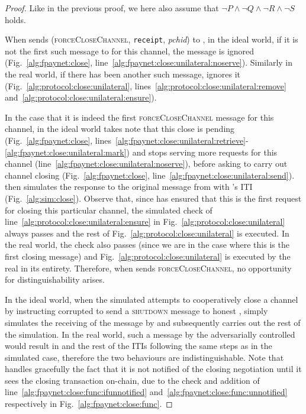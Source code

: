 \begin{proof}
  Like in the previous proof, we here also assume that $\neg P \wedge \neg Q
  \wedge \neg R \wedge \neg S$ holds.

  When \environment{} sends (\textsc{forceCloseChannel}, \texttt{receipt},
  \textit{pchid}) to \alice, in the ideal world, if it is not the first such
  message to \alice{} for this channel, the message is ignored
  (Fig.~\ref{alg:fpaynet:close},
  line~\ref{alg:fpaynet:close:unilateral:noserve}). Similarly in the real world,
  if there has been another such message, \alice{} ignores it
  (Fig.~\ref{alg:protocol:close:unilateral},
  lines~\ref{alg:protocol:close:unilateral:remove}
  and~\ref{alg:protocol:close:unilateral:ensure}).

  In the case that it is indeed the first \textsc{forceCloseChannel} message for
  this channel, in the ideal world \fpaynet{} takes note that this close is
  pending (Fig.~\ref{alg:fpaynet:close},
  lines~\ref{alg:fpaynet:close:unilateral:retrieve}-\ref{alg:fpaynet:close:unilateral:mark})
  and stops serving more requests for this channel
  (line~\ref{alg:fpaynet:close:unilateral:noserve}), before asking \simulator{}
  to carry out channel closing (Fig.~\ref{alg:fpaynet:close},
  line~\ref{alg:fpaynet:close:unilateral:send}). \simulator{} then simulates the
  response to the original message from \environment{} with \alice's ITI
  (Fig.~\ref{alg:sim:close}). Observe that, since \fpaynet{} has ensured that
  this is the first request for closing this particular channel, the simulated
  check of line~\ref{alg:protocol:close:unilateral:ensure} in
  Fig.~\ref{alg:protocol:close:unilateral} always passes and the rest of
  Fig.~\ref{alg:protocol:close:unilateral} is executed. In the real world, the
  check also passes (since we are in the case where this is the first closing
  message) and Fig.~\ref{alg:protocol:close:unilateral} is executed by the real
  \alice{} in its entirety. Therefore, when \environment{} sends
  \textsc{forceCloseChannel}, no opportunity for distinguishability arises.

  In the ideal world, when the simulated \adversary{} attempts to cooperatively
  close a channel by instructing corrupted \alice{} to send a \textsc{shutdown}
  message to honest \bob, \simulator{} simply simulates the receiving of the
  message by \bob{} and subsequently carries out the rest of the simulation. In
  the real world, such a message by the adversarially controlled \alice{} would
  result in \bob{} and the rest of the ITIs following the same steps as in the
  simulated case, therefore the two behaviours are indistinguishable. Note that
  \fpaynet{} handles gracefully the fact that it is not notified of the closing
  negotiation until it sees the closing transaction on-chain, due to the check
  and addition of line~\ref{alg:fpaynet:close:func:ifunnotified}
  and~\ref{alg:fpaynet:close:func:unnotified} respectively in
  Fig.~\ref{alg:fpaynet:close:func}.


\end{proof}
